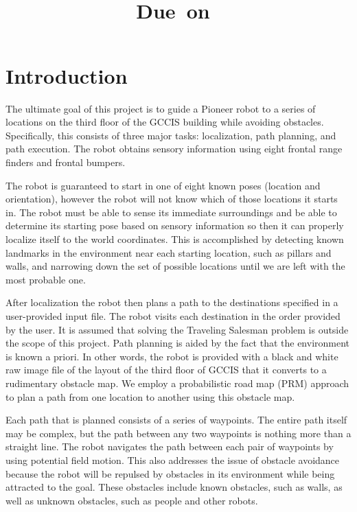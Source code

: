 \documentclass[12pt]{article}
\title{
  \vspace{2in}
  \textmd{\textbf{\hmwkTitle}} \\
  \vspace{0.1in}
  \large{\textmd{\hmwkClassInstructor}} \\
  \vspace{0.1in}
  \normalsize\small{Due\ on\ \hmwkDueDate} \\
  \vspace{3in}
}
\date{} %
\author{\textbf{\hmwkAuthorName}}
\begin{document}
\maketitle
\thispagestyle{empty}

\newpage %

\section{Introduction}

The ultimate goal of this project is to guide a Pioneer robot to a series of locations on the third floor of the GCCIS building while avoiding obstacles. Specifically, this consists of three major tasks: localization, path planning, and path execution. The robot obtains sensory information using eight frontal range finders and frontal bumpers.

The robot is guaranteed to start in one of eight known poses (location and orientation), however the robot will not know which of those locations it starts in. The robot must be able to sense its immediate surroundings and be able to determine its starting pose based on sensory information so then it can properly localize itself to the world coordinates. This is accomplished by detecting known landmarks in the environment near each starting location, such as pillars and walls, and narrowing down the set of possible locations until we are left with the most probable one. 

After localization the robot then plans a path to the destinations specified in a user-provided input file. The robot visits each destination in the order provided by the user. It is assumed that solving the Traveling Salesman problem is outside the scope of this project. Path planning is aided by the fact that the environment is known a priori. In other words, the robot is provided with a black and white raw image file of the layout of the third floor of GCCIS that it converts to a rudimentary obstacle map. We employ a probabilistic road map (PRM) approach to plan a path from one location to another using this obstacle map.

Each path that is planned consists of a series of waypoints. The entire path itself may be complex, but the path between any two waypoints is nothing more than a straight line. The robot navigates the path between each pair of waypoints by using potential field motion. This also addresses the issue of obstacle avoidance because the robot will be repulsed by obstacles in its environment while being attracted to the goal. These obstacles include known obstacles, such as walls, as well as unknown obstacles, such as people and other robots.
\end{document}
